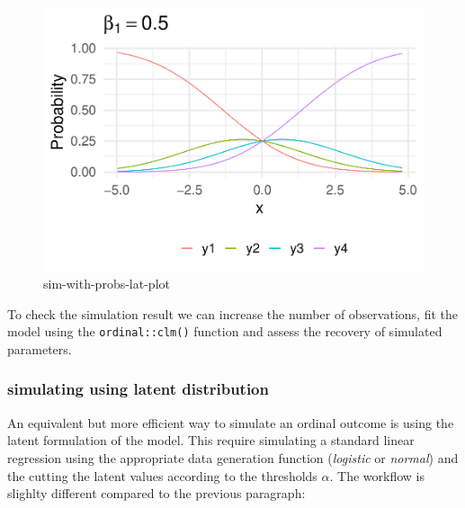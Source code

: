 \documentclass[
  man,floatsintext]{apa6}
\begin{document}
\begin{figure}

{\centering \includegraphics{paper-new_files/figure-latex/sim-with-probs-lat-plot-1} 

}

\caption{sim-with-probs-lat-plot}\label{fig:sim-with-probs-lat-plot}
\end{figure}

\normalsize

\scriptsize

\normalsize

To check the simulation result we can increase the number of observations, fit the model using the \texttt{ordinal::clm()} function and assess the recovery of simulated parameters.

\scriptsize

\normalsize

\scriptsize

\normalsize

\subsubsection{simulating using latent distribution}\label{simulating-using-latent-distribution}

An equivalent but more efficient way to simulate an ordinal outcome is using the latent formulation of the model. This require simulating a standard linear regression using the appropriate data generation function (\emph{logistic} or \emph{normal}) and the cutting the latent values according to the thresholds \(\alpha\). The workflow is slighlty different compared to the previous paragraph:
\end{document}
